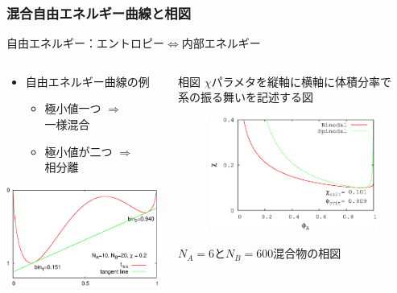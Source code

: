\documentclass[12pt, dvipdfmx]{beamer}
\begin{document}
\begin{frame}\frametitle{混合自由エネルギー曲線と相図}

	\color{red}自由エネルギー：エントロピー$\Leftrightarrow$内部エネルギー\color{black}
	\begin{columns}
		\begin{column}{5.5cm}
			\begin{itemize}
				\item 自由エネルギー曲線の例
				\begin{itemize}
					\item 極小値一つ $\Rightarrow$ \\一様混合
					\item 極小値が二つ $\Rightarrow$ \\相分離
				\end{itemize}
			\end{itemize}
		\vspace{-0.5\baselineskip}
				\begin{center}
					\includegraphics[width=50mm]{FE_tan_A10B20Chi0_2.eps}
				\end{center}
		\end{column}
		\begin{column}{5.5cm}
			\begin{block}{相図}
			{\footnotesize $\chi$パラメタを縦軸に横軸に体積分率で\\系の振る舞いを記述する図}
			\end{block}
			\vspace{-1\baselineskip}
			\begin{figure}[htbp]
				\begin{center}
					\includegraphics[width=55mm]{PD_6_600.eps}
				\end{center}
			\end{figure}
			\begin{center}
				\vspace{-1\baselineskip}
				{\footnotesize $N_A = 6$と$N_B = 600$混合物の相図}
			\end{center}
		\end{column}
	\end{columns}
	

\end{frame}
\end{document}
